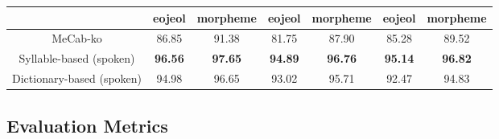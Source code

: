 \documentclass[AMS,STIX2COL]{WileyNJD-v2}
\begin{document}
\begin{table}[]
\begin{tabular*}{500pt}{@{\extracolsep\fill}c|cccccc@{\extracolsep\fill}}
            \cmidrule{2-3} \cmidrule{4-5} \cmidrule{6-7}
            & \multicolumn{1}{c}{eojeol} & \multicolumn{1}{c}{morpheme} & \multicolumn{1}{c}{eojeol} & \multicolumn{1}{c}{morpheme} & \multicolumn{1}{c}{eojeol} & \multicolumn{1}{c}{morpheme} \\
            \midrule
            \hspace{2mm}MeCab-ko                   & 86.85                      & 91.38                        & 81.75                      & 87.90                        & 85.28                      & 89.52                        \\
            \hspace{2mm}Syllable-based (spoken)    & \textbf{96.56}             & \textbf{97.65}               & \textbf{94.89}             & \textbf{96.76}               & \textbf{95.14}             & \textbf{96.82}               \\
            \hspace{2mm}Dictionary-based (spoken)  & 94.98                      & 96.65                        & 93.02                      & 95.71                        & 92.47                      & 94.83                        \\
            \bottomrule
        \end{tabular*}
    \end{table}

    \subsection{Evaluation Metrics}\label{subsec5.2}
\end{document}
